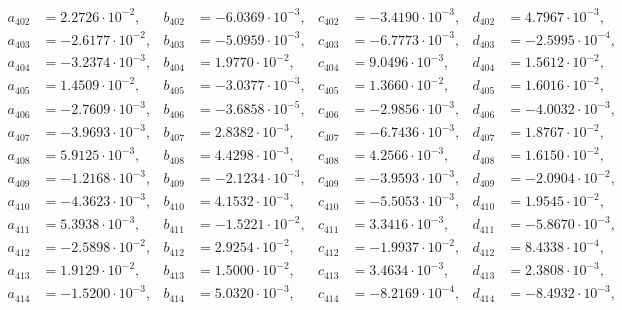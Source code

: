 \begin{align*}
  a_{ 402 } &= 2.2726 \cdot 10^{ -2 }, & b_{ 402 } &= -6.0369 \cdot 10^{ -3 }, & c_{ 402 } &= -3.4190 \cdot 10^{ -3 }, & d_{ 402 } &= 4.7967 \cdot 10^{ -3 }, \\ 
  a_{ 403 } &= -2.6177 \cdot 10^{ -2 }, & b_{ 403 } &= -5.0959 \cdot 10^{ -3 }, & c_{ 403 } &= -6.7773 \cdot 10^{ -3 }, & d_{ 403 } &= -2.5995 \cdot 10^{ -4 }, \\ 
  a_{ 404 } &= -3.2374 \cdot 10^{ -3 }, & b_{ 404 } &= 1.9770 \cdot 10^{ -2 }, & c_{ 404 } &= 9.0496 \cdot 10^{ -3 }, & d_{ 404 } &= 1.5612 \cdot 10^{ -2 }, \\ 
  a_{ 405 } &= 1.4509 \cdot 10^{ -2 }, & b_{ 405 } &= -3.0377 \cdot 10^{ -3 }, & c_{ 405 } &= 1.3660 \cdot 10^{ -2 }, & d_{ 405 } &= 1.6016 \cdot 10^{ -2 }, \\ 
  a_{ 406 } &= -2.7609 \cdot 10^{ -3 }, & b_{ 406 } &= -3.6858 \cdot 10^{ -5 }, & c_{ 406 } &= -2.9856 \cdot 10^{ -3 }, & d_{ 406 } &= -4.0032 \cdot 10^{ -3 }, \\ 
  a_{ 407 } &= -3.9693 \cdot 10^{ -3 }, & b_{ 407 } &= 2.8382 \cdot 10^{ -3 }, & c_{ 407 } &= -6.7436 \cdot 10^{ -3 }, & d_{ 407 } &= 1.8767 \cdot 10^{ -2 }, \\ 
  a_{ 408 } &= 5.9125 \cdot 10^{ -3 }, & b_{ 408 } &= 4.4298 \cdot 10^{ -3 }, & c_{ 408 } &= 4.2566 \cdot 10^{ -3 }, & d_{ 408 } &= 1.6150 \cdot 10^{ -2 }, \\ 
  a_{ 409 } &= -1.2168 \cdot 10^{ -3 }, & b_{ 409 } &= -2.1234 \cdot 10^{ -3 }, & c_{ 409 } &= -3.9593 \cdot 10^{ -3 }, & d_{ 409 } &= -2.0904 \cdot 10^{ -2 }, \\ 
  a_{ 410 } &= -4.3623 \cdot 10^{ -3 }, & b_{ 410 } &= 4.1532 \cdot 10^{ -3 }, & c_{ 410 } &= -5.5053 \cdot 10^{ -3 }, & d_{ 410 } &= 1.9545 \cdot 10^{ -2 }, \\ 
  a_{ 411 } &= 5.3938 \cdot 10^{ -3 }, & b_{ 411 } &= -1.5221 \cdot 10^{ -2 }, & c_{ 411 } &= 3.3416 \cdot 10^{ -3 }, & d_{ 411 } &= -5.8670 \cdot 10^{ -3 }, \\ 
  a_{ 412 } &= -2.5898 \cdot 10^{ -2 }, & b_{ 412 } &= 2.9254 \cdot 10^{ -2 }, & c_{ 412 } &= -1.9937 \cdot 10^{ -2 }, & d_{ 412 } &= 8.4338 \cdot 10^{ -4 }, \\ 
  a_{ 413 } &= 1.9129 \cdot 10^{ -2 }, & b_{ 413 } &= 1.5000 \cdot 10^{ -2 }, & c_{ 413 } &= 3.4634 \cdot 10^{ -3 }, & d_{ 413 } &= 2.3808 \cdot 10^{ -3 }, \\ 
  a_{ 414 } &= -1.5200 \cdot 10^{ -3 }, & b_{ 414 } &= 5.0320 \cdot 10^{ -3 }, & c_{ 414 } &= -8.2169 \cdot 10^{ -4 }, & d_{ 414 } &= -8.4932 \cdot 10^{ -3 }, \\ 

\end{align*}
